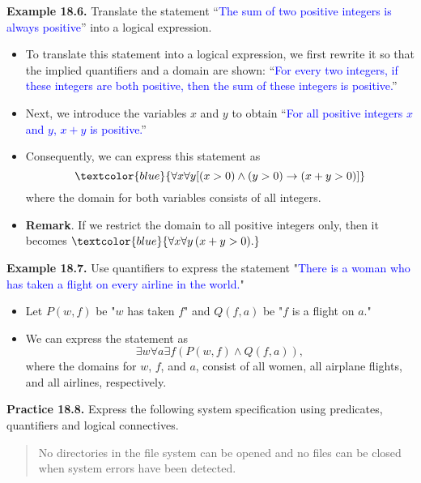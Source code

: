 \documentclass[aspectratio=169]{beamer}
\providecommand{\Blue}[1]{\textcolor{blue}{#1}}
\begin{document}
\begin{frame}[plain]{ }

{\bf Example 18.6.} Translate the statement 
``\Blue{The sum of two positive integers is always positive}'' into a logical
expression. \pause

 \begin{itemize}[<+->]
  \item To translate this statement into a logical   expression, 
   we first rewrite it so that the implied
   quantifiers and a domain are shown:
     ``\Blue{For every two integers, if these integers are both positive,
then the sum of these integers is positive.}''
   \item Next, we introduce the variables $x$ and $y$ to obtain ``\Blue{For
all positive integers $x$ and $y$, $x+y$ is positive.}''
   \item Consequently, we can express this statement as
   \[ \Blue{\forall x\forall y [(x>0)\wedge (y>0) \rightarrow (x+y>0)] }\]
 where the domain for both variables consists of all integers.
 \item {\bf Remark}. If we restrict the domain to all positive integers only, then it becomes
 $\Blue{\forall x\forall y\, (x+y>0).}$
 \end{itemize}

\end{frame}

\begin{frame}[plain]{ }

{\bf Example 18.7.} 
Use quantifiers to express the statement 
"\Blue{There is a woman who has taken a flight on every airline in the world.}"
 \pause

 \begin{itemize}[<+->]
  \item Let $P(w,f)$ be "$w$ has taken $f$" and $Q(f,a)$ be "$f$ is a flight on $a$."
  \item We can express the statement as
  \[ \exists w \forall a  \exists f \left( P(w,f)\wedge Q(f,a)\right), 
  \]
  where the domains for $w$, $f$, and $a$, consist of all women,
  all airplane flights, and all airlines, respectively.
 \end{itemize}
 \vspace{.5in}
 

\end{frame}

\begin{frame}[plain]{}

 {\bf Practice 18.8.} Express the following system specification
  using predicates, quantifiers and logical connectives.
  
  \begin{quote}
   No directories in the file system can be opened and no files can be closed 
   when system errors have
   been detected.
  \end{quote}
  
  \vspace{1.5in}
  
\end{frame}
\end{document}
